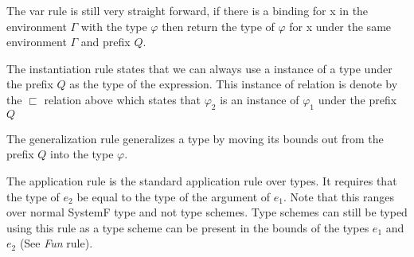 \begin{prooftree}
\end{prooftree}

The var rule is still very straight forward, if there is a binding for x in the environment $\Gamma$ with the type $\varphi$ then return the type of $\varphi$ for x under the same environment $\Gamma$ and prefix $Q$.

\begin{prooftree}
\end{prooftree}

The instantiation rule states that we can always use a instance of a type under the prefix $Q$ as the type of the expression. This instance of relation is denote by the $\sqsubset$ relation above which states that $\varphi_2$ is an instance of $\varphi_1$ under the prefix $Q$

\begin{prooftree}
\end{prooftree}

The generalization rule generalizes a type by moving its bounds out from the prefix $Q$ into the type $\varphi$.

\begin{prooftree}
\end{prooftree}

The application rule is the standard application rule over types. It requires that the type of $e_2$ be equal to the type of the argument of $e_1$. Note that this ranges over normal SystemF type and not type schemes. Type schemes can still be typed using this rule as a type scheme can be present in the bounds of the types $e_1$ and $e_2$ (See \emph{Fun} rule).

\begin{prooftree}
\end{prooftree}

